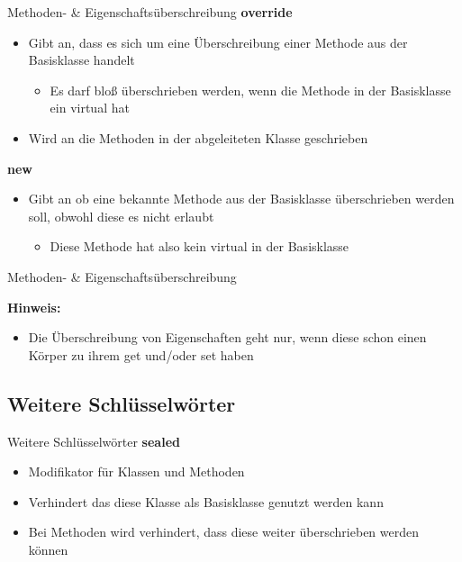 \begin{frame}{Methoden- \& Eigenschaftsüberschreibung}	
	\textbf{override}\\
	\begin{itemize}
		\item Gibt an, dass es sich um eine Überschreibung einer Methode aus der Basisklasse handelt
		\begin{itemize}
			\item Es darf bloß überschrieben werden, wenn die Methode in der Basisklasse ein \alert{virtual} hat
		\end{itemize}
		\item Wird an die Methoden in der abgeleiteten Klasse geschrieben
	\end{itemize}
	\textbf{new}\\
	\begin{itemize}
		\item Gibt an ob eine bekannte Methode aus der Basisklasse überschrieben werden soll, obwohl diese es nicht erlaubt
		\begin{itemize}
			\item Diese Methode hat also kein \alert{virtual} in der Basisklasse
		\end{itemize}
	\end{itemize}
\end{frame}

\begin{frame}{Methoden- \& Eigenschaftsüberschreibung}
		
	\textbf{Hinweis:}
	\begin{itemize}
		\item Die Überschreibung von Eigenschaften geht nur, wenn diese schon einen Körper zu ihrem \alert{get} und/oder \alert{set} haben
	\end{itemize}
\end{frame}

\subsection{Weitere Schlüsselwörter}
\begin{frame}{Weitere Schlüsselwörter}
	\textbf{sealed}\\
	\begin{itemize}
		\item Modifikator für Klassen und Methoden
		\item Verhindert das diese Klasse als Basisklasse genutzt werden kann
		\item Bei Methoden wird verhindert, dass diese weiter überschrieben werden können
	\end{itemize}
	
\end{frame}

